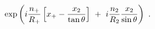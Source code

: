 \begin{equation}
     \exp\left( i {n_+\over R_+} \left[x_+ - {x_2\over
\tan\theta}\right] 
                 ~+~ i{n_2\over R_2} {x_2\over \sin\theta} \right)~.
\label{KKfuncts}
\end{equation}

